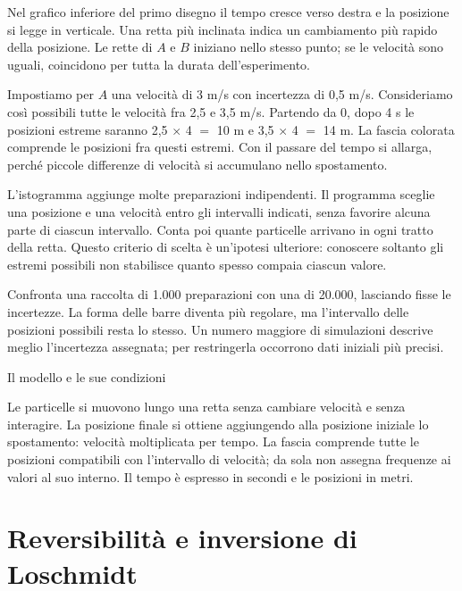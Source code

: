 Nel grafico inferiore del primo disegno il tempo cresce verso destra e la posizione si legge in verticale. Una retta più inclinata indica un cambiamento più rapido della posizione. Le rette di \(A\) e \(B\) iniziano nello stesso punto; se le velocità sono uguali, coincidono per tutta la durata dell'esperimento.\par

Impostiamo per \(A\) una velocità di 3 m/s con incertezza di 0,5 m/s. Consideriamo così possibili tutte le velocità fra 2,5 e 3,5 m/s. Partendo da 0, dopo 4 s le posizioni estreme saranno 2,5 \(\times\) 4 \(=\) 10 m e 3,5 \(\times\) 4 \(=\) 14 m. La fascia colorata comprende le posizioni fra questi estremi. Con il passare del tempo si allarga, perché piccole differenze di velocità si accumulano nello spostamento.\par

L'istogramma aggiunge molte preparazioni indipendenti. Il programma sceglie una posizione e una velocità entro gli intervalli indicati, senza favorire alcuna parte di ciascun intervallo. Conta poi quante particelle arrivano in ogni tratto della retta. Questo criterio di scelta è un'ipotesi ulteriore: conoscere soltanto gli estremi possibili non stabilisce quanto spesso compaia ciascun valore.\par

Confronta una raccolta di 1.000 preparazioni con una di 20.000, lasciando fisse le incertezze. La forma delle barre diventa più regolare, ma l'intervallo delle posizioni possibili resta lo stesso. Un numero maggiore di simulazioni descrive meglio l'incertezza assegnata; per restringerla occorrono dati iniziali più precisi.\par


Il modello e le sue condizioni\par

Le particelle si muovono lungo una retta senza cambiare velocità e senza interagire. La posizione finale si ottiene aggiungendo alla posizione iniziale lo spostamento: velocità moltiplicata per tempo. La fascia comprende tutte le posizioni compatibili con l'intervallo di velocità; da sola non assegna frequenze ai valori al suo interno. Il tempo è espresso in secondi e le posizioni in metri.\par




\Needspace{.43\textheight}
\section{Reversibilità e inversione di Loschmidt}
\label{c1-loschmidt}

